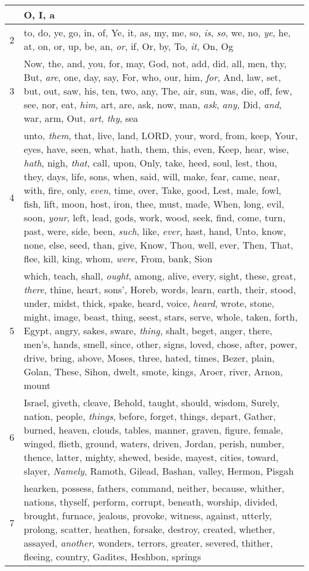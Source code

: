 \begin{longtable}{l|p{3.75in}}
\hline \hline
\endlastfoot
1 & O, I, a \\ \hline
2 & to, do, ye, go, in, of, Ye, it, as, my, me, so, \emph{is}, \emph{so}, we, no, \emph{ye}, he, at, on, or, up, be, an, \emph{or}, if, Or, by, To, \emph{it}, On, Og \\ \hline
3 & Now, the, and, you, for, may, God, not, add, did, all, men, thy, But, \emph{are}, one, day, say, For, who, our, him, \emph{for}, And, law, set, but, out, saw, his, ten, two, any, The, air, sun, was, die, off, few, see, nor, eat, \emph{him}, art, are, ask, now, man, \emph{ask}, \emph{any}, Did, \emph{and}, war, arm, Out, \emph{art}, \emph{thy}, sea \\ \hline
4 & unto, \emph{them}, that, live, land, LORD, your, word, from, keep, Your, eyes, have, seen, what, hath, them, this, even, Keep, hear, wise, \emph{hath}, nigh, \emph{that}, call, upon, Only, take, heed, soul, lest, thou, they, days, life, sons, when, said, will, make, fear, came, near, with, fire, only, \emph{even}, time, over, Take, good, Lest, male, fowl, fish, lift, moon, host, iron, thee, must, made, When, long, evil, soon, \emph{your}, left, lead, gods, work, wood, seek, find, come, turn, past, were, side, been, \emph{such}, like, \emph{ever}, hast, hand, Unto, know, none, else, seed, than, give, Know, Thou, well, ever, Then, That, flee, kill, king, whom, \emph{were}, From, bank, Sion \\ \hline
5 & which, teach, shall, \emph{ought}, among, alive, every, sight, these, great, \emph{there}, thine, heart, sons', Horeb, words, learn, earth, their, stood, under, midst, thick, spake, heard, voice, \emph{heard}, wrote, stone, might, image, beast, thing, seest, stars, serve, whole, taken, forth, Egypt, angry, sakes, sware, \emph{thing}, shalt, beget, anger, there, men's, hands, smell, since, other, signs, loved, chose, after, power, drive, bring, above, Moses, three, hated, times, Bezer, plain, Golan, These, Sihon, dwelt, smote, kings, Aroer, river, Arnon, mount \\ \hline
6 & Israel, giveth, cleave, Behold, taught, should, wisdom, Surely, nation, people, \emph{things}, before, forget, things, depart, Gather, burned, heaven, clouds, tables, manner, graven, figure, female, winged, flieth, ground, waters, driven, Jordan, perish, number, thence, latter, mighty, shewed, beside, mayest, cities, toward, slayer, \emph{Namely}, Ramoth, Gilead, Bashan, valley, Hermon, Pisgah \\ \hline
7 & hearken, possess, fathers, command, neither, because, whither, nations, thyself, perform, corrupt, beneath, worship, divided, brought, furnace, jealous, provoke, witness, against, utterly, prolong, scatter, heathen, forsake, destroy, created, whether, assayed, \emph{another}, wonders, terrors, greater, severed, thither, fleeing, country, Gadites, Heshbon, springs \\ \hline

\end{longtable}
